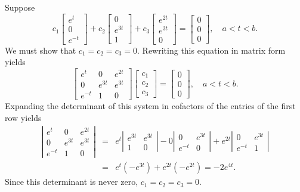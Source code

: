 \begin{examplesolution}
\solution Suppose
\[
  c_{1}\left[
  \begin{array}{c}
    e^{t}  \\
    0      \\
    e^{-t}
  \end{array}\right]+ c_{2}\left[
  \begin{array}{c}
    0      \\
    e^{3t} \\
    1
  \end{array}\right]+c_{3}\left[
  \begin{array}{c}
    e^{2t} \\
    e^{3t} \\
    0
  \end{array}\right]= \left[
  \begin{array}{c}
    0 \\
    0 \\
    0
  \end{array}\right],\quad a<t<b.
\]
We must show that $c_{1}=c_{2}=c_{3}=0$. Rewriting this equation in matrix form yields
\[
  \left[
  \begin{array}{ccc}
    e^{t}  & 0      & e^{2t} \\
    0      & e^{3t} & e^{3t} \\
    e^{-t} & 1      & 0
  \end{array}\right] \left[
  \begin{array}{c}
    c_{1} \\
    c_{2} \\
    c_{3}
  \end{array}\right]= \left[
  \begin{array}{c}
    0 \\
    0 \\
    0
  \end{array}\right],\quad a<t<b.
\]
Expanding the determinant of this system in cofactors of the entries of the first row yields
\begin{eqnarray*}
  \left|
  \begin{array}{ccc}
    e^{t}  & 0      & e^{2t} \\
    0      & e^{3t} & e^{3t} \\
    e^{-t} & 1      & 0
  \end{array}\right|&=&e^{t} \left|
  \begin{array}{cc}
    e^{3t} & e^{3t} \\
    1      & 0
  \end{array}\right|-0 \left|
  \begin{array}{cc}
    0      & e^{3t} \\
    e^{-t} & 0
  \end{array}\right| +e^{2t}\left|
  \begin{array}{cc}
    0      & e^{3t} \\
    e^{-t} & 1
  \end{array}\right|\\ &=&e^{t}(-e^{3t})+e^{2t}(-e^{2t})=-2e^{4t}.
\end{eqnarray*}
Since this determinant is never zero, $c_{1}=c_{2}=c_{3}=0$. \bbox
\end{examplesolution}

